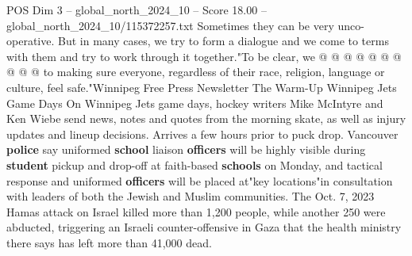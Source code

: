 \begin{textsample}{POS Dim 3 – global\_north\_2024\_10 – Score 18.00 – global\_north\_2024\_10/115372257.txt}
Sometimes they can be very unco-operative.
But in many cases, we try to form a dialogue and we come to terms with them and try to work through it together."To be clear, we @ @ @ @ @ @ @ @ @ @ to making sure everyone, regardless of their race, religion, language or culture, feel safe."Winnipeg Free Press Newsletter The Warm-Up Winnipeg Jets Game Days On Winnipeg Jets game days, hockey writers Mike McIntyre and Ken Wiebe send news, notes and quotes from the morning skate, as well as injury updates and lineup decisions.
Arrives a few hours prior to puck drop.
Vancouver \textbf{police} say uniformed \textbf{school} liaison \textbf{officers} will be highly visible during \textbf{student} pickup and drop-off at faith-based \textbf{schools} on Monday, and tactical response and uniformed \textbf{officers} will be placed at"key locations"in consultation with leaders of both the Jewish and Muslim communities.
The Oct. 7, 2023 Hamas attack on Israel killed more than 1,200 people, while another 250 were abducted, triggering an Israeli counter-offensive in Gaza that the health ministry there says has left more than 41,000 dead.

\end{textsample}
